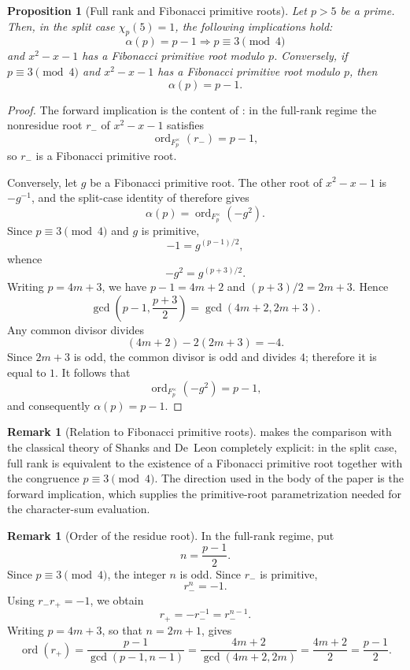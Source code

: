 \documentclass[preprint,12pt]{elsarticle}
\def\F{F}%
\numberwithin{equation}{section}
\theoremstyle{plain}
\newtheorem{proposition}[theorem]{Proposition}
\theoremstyle{definition}
\newtheorem{remark}[theorem]{Remark}
\DeclareMathOperator{\ord}{ord}
\newcommand{\F}{\mathbb{F}}
\begin{document}
\begin{proposition}[Full rank and Fibonacci primitive roots]
\label{prop:full-rank-fpr-equivalence}
Let $p>5$ be a prime. Then, in the split case $\chi_p(5)=1$, the
following implications hold:
\[
\alpha(p)=p-1
\Longrightarrow
p\equiv3\pmod4 
\]
and $x^2-x-1$ has a Fibonacci primitive root modulo $p$.
Conversely, if $p\equiv3\pmod4$ and $x^2-x-1$ has a Fibonacci
primitive root modulo $p$, then
\[
\alpha(p)=p-1.
\]
\end{proposition}
\begin{proof}
The forward implication is the content of
: in the full-rank regime the
nonresidue root $r_-$ of $x^2-x-1$ satisfies
\[
\ord_{\F_p^\times}(r_-)=p-1,
\]
so $r_-$ is a Fibonacci primitive root.
 
Conversely, let $g$ be a Fibonacci primitive root. The other root of
$x^2-x-1$ is $-g^{-1}$, and the split-case identity of
 therefore gives
\[
\alpha(p)=\ord_{\F_p^\times}(-g^2).
\]
Since $p\equiv3\pmod4$ and $g$ is primitive,
\[
-1=g^{(p-1)/2},
\]
whence
\[
-g^2=g^{(p+3)/2}.
\]
Writing $p=4m+3$, we have $p-1=4m+2$ and
$(p+3)/2=2m+3$. Hence
\[
\gcd\!\left(p-1,\frac{p+3}{2}\right)
=
\gcd(4m+2,2m+3).
\]
Any common divisor divides
\[
(4m+2)-2(2m+3)=-4.
\]
Since $2m+3$ is odd, the common divisor is odd and divides $4$;
therefore it is equal to $1$. It follows that
\[
\ord_{\F_p^\times}(-g^2)=p-1,
\]
and consequently $\alpha(p)=p-1$.
\end{proof}
 
\begin{remark}[Relation to Fibonacci primitive roots]
\label{rem:primitive-root-literature}
 makes the comparison with the
classical theory of Shanks \cite{Shanks1972} and De~Leon
\cite{DeLeon1977} completely explicit: in the split case, full rank
is equivalent to the existence of a Fibonacci primitive root together
with the congruence $p\equiv3\pmod4$. The direction used in the body
of the paper is the forward implication, which supplies the
primitive-root parametrization needed for the character-sum
evaluation.
\end{remark}
 
\begin{remark}[Order of the residue root]
\label{rem:residue-root-order}
In the full-rank regime, put
\[
n=\frac{p-1}{2}.
\]
Since $p\equiv3\pmod4$, the integer $n$ is odd. Since $r_-$ is
primitive,
\[
r_-^n=-1.
\]
Using $r_-r_+=-1$, we obtain
\[
r_+=-r_-^{-1}=r_-^{n-1}.
\]
Writing $p=4m+3$, so that $n=2m+1$, gives
\[
\ord(r_+)
=
\frac{p-1}{\gcd(p-1,n-1)}
=
\frac{4m+2}{\gcd(4m+2,2m)}
=
\frac{4m+2}{2}
=
\frac{p-1}{2}.
\]
\end{remark}
 
\end{document}
